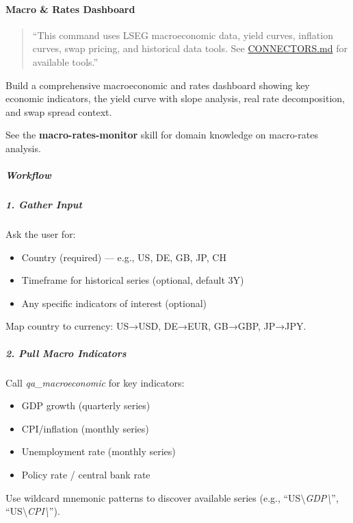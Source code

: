 \documentclass[11pt]{article}
\begin{document}
\paragraph{Macro \& Rates Dashboard}\mbox{}\par

\begin{quote}
``This command uses LSEG macroeconomic data, yield curves, inflation curves, swap pricing, and historical data tools. See \href{../CONNECTORS.md}{CONNECTORS.md} for available tools.''
\end{quote}

Build a comprehensive macroeconomic and rates dashboard showing key economic indicators, the yield curve with slope analysis, real rate decomposition, and swap spread context.


See the \textbf{macro-rates-monitor} skill for domain knowledge on macro-rates analysis.


\subparagraph{Workflow}\mbox{}\par

\subparagraph{1. Gather Input}\mbox{}\par

Ask the user for:

\begin{itemize}[leftmargin=*,itemsep=2pt,topsep=2pt]
\item {} Country (required) — e.g., US, DE, GB, JP, CH
\item {} Timeframe for historical series (optional, default 3Y)
\item {} Any specific indicators of interest (optional)
\end{itemize}

Map country to currency: US→USD, DE→EUR, GB→GBP, JP→JPY.


\subparagraph{2. Pull Macro Indicators}\mbox{}\par

Call \emph{qa\_\allowbreak{}macroeconomic} for key indicators:

\begin{itemize}[leftmargin=*,itemsep=2pt,topsep=2pt]
\item {} GDP growth (quarterly series)
\item {} CPI/inflation (monthly series)
\item {} Unemployment rate (monthly series)
\item {} Policy rate / central bank rate
\end{itemize}

Use wildcard mnemonic patterns to discover available series (e.g., ``US\textbackslash{}\emph{GDP\textbackslash{}}'', ``US\textbackslash{}\emph{CPI\textbackslash{}}'').
\end{document}
